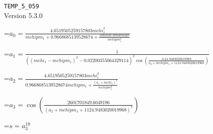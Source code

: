 \documentclass{article}
\newcommand{\exprline}[1]{\par\noindent\begingroup\setbox0=\hbox{$\displaystyle #1$}\ifdim\wd0>\linewidth\resizebox{\linewidth}{!}{\box0}\else\box0\fi\endgroup\par\medskip}
\begin{document}
\noindent\texttt{TEMP\_5\_059}\\
Version 5.3.0\\
\exprline{a_{0} = \frac{4.6519505259157803 mchi_{1}^{2}}{mchipm_{1} + 0.9668685139528674 + \frac{1891639.3970876367}{mchipm_{1}^{2}}}}
\exprline{a_{1} = \frac{1}{\left(\left(mchi_{1} - mchipm_{1}\right)^{2} - 0.02200355064329114\right)^{2} \cos{\left(\frac{1124.9483020019968}{a_{0} + mchipm_{1} + 1124.9483020019968} \right)}}}
\exprline{a_{2} = \frac{4.6519505259157803 mchi_{1}^{2}}{0.9668685139528674 mchipm_{1} + \frac{\left(a_{1} + mchi_{1}\right)^{2}}{mchipm_{1}^{2}}}}
\exprline{a_{3} = \cos{\left(\frac{2601701849.6049196}{\left(a_{2} + mchipm_{1} + 1124.9483020019968\right)^{3}} \right)}}
\exprline{s = a_{3}^{18}}
\end{document}
